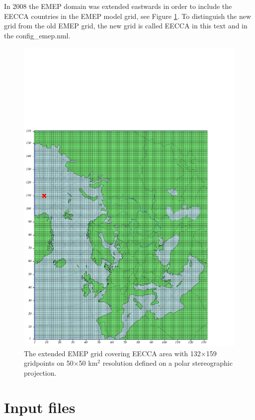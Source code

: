 \documentclass[a4paper,12pt]{report}
\begin{document}
In 2008 the EMEP domain was extended eastwards in order to include the 
EECCA countries in the EMEP model grid, see Figure \ref{fig:EECCA}. To distinguish the new grid from the old EMEP 
grid, the new grid is called EECCA in this text and in the config\_emep.nml.

\begin{figure}[ht]
 \centering
\includegraphics[scale=1.1]{EECCA}
\caption{The extended EMEP grid covering EECCA area with
132$\times$159 gridpoints on 50$\times$50 km$^2$ resolution defined on
a polar stereographic
projection.}\label{fig:EECCA}
\end{figure}

\chapter{Input files}
\label{ch:InputFiles}
\end{document}

